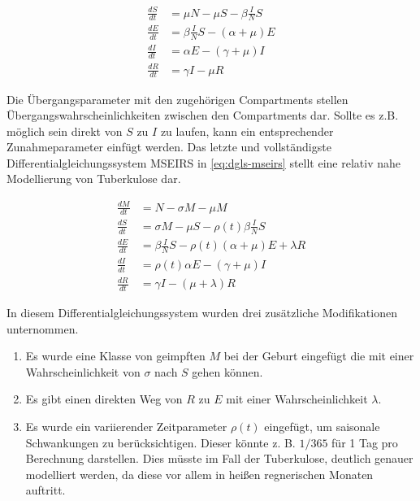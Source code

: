\documentclass[paper=a4, fontsize=11pt, ngerman, abstract=on]{scrartcl}
\numberwithin{equation}{section} %
\numberwithin{figure}{section} %
\numberwithin{table}{section} %
\begin{document}
\begin{equation}
\begin{split}
\frac{dS}{dt} &= \mu N - \mu S - \beta \frac{I}{N}S \\
\frac{dE}{dt} &= \beta \frac{I}{N}S - (\alpha + \mu)E \\
\frac{dI}{dt} &= \alpha E - (\gamma + \mu)I \\
\frac{dR}{dt} &= \gamma I - \mu R
\end{split}
\label{eq:dgls-seir}
\end{equation}

Die Übergangsparameter mit den zugehörigen Compartments stellen Übergangswahrscheinlichkeiten zwischen den Compartments dar. Sollte es z.B. möglich sein direkt von $S$ zu $I$ zu laufen, kann ein entsprechender Zunahmeparameter einfügt werden. Das letzte und vollständigste Differentialgleichungssystem MSEIRS in \ref{eq:dgls-mseirs} stellt eine relativ nahe Modellierung von Tuberkulose dar.

\begin{equation}
\begin{split}
\frac{dM}{dt} &= N - \sigma M - \mu M \\
\frac{dS}{dt} &= \sigma M - \mu S - \rho(t)\beta \frac{I}{N}S \\
\frac{dE}{dt} &= \beta \frac{I}{N}S - \rho(t)(\alpha + \mu)E + \lambda R \\
\frac{dI}{dt} &= \rho(t)\alpha E - (\gamma + \mu)I \\
\frac{dR}{dt} &= \gamma I - (\mu + \lambda) R
\end{split}
\label{eq:dgls-mseirs}
\end{equation}

In diesem Differentialgleichungssystem wurden drei zusätzliche Modifikationen unternommen.

\begin{enumerate}
\item{Es wurde eine Klasse von geimpften $M$ bei der Geburt eingefügt die mit einer Wahrscheinlichkeit von $\sigma$ nach $S$ gehen können.}
\item{Es gibt einen direkten Weg von $R$ zu $E$ mit einer Wahrscheinlichkeit $\lambda$.}
\item{Es wurde ein variierender Zeitparameter $\rho (t)$ eingefügt, um saisonale Schwankungen zu berücksichtigen. Dieser könnte z. B. $1/365$ für 1 Tag pro Berechnung darstellen. Dies müsste im Fall der Tuberkulose, deutlich genauer modelliert werden, da diese vor allem in heißen regnerischen Monaten auftritt.}
\end{enumerate}
\end{document}
